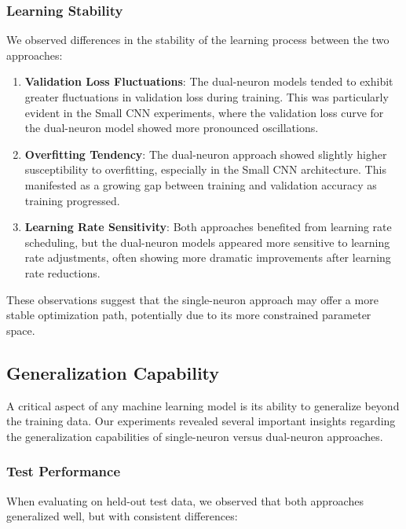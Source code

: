 \subsubsection{Learning Stability}

We observed differences in the stability of the learning process between the two approaches:

\begin{enumerate}
\item \textbf{Validation Loss Fluctuations}: The dual-neuron models tended to exhibit greater fluctuations in validation loss during training. This was particularly evident in the Small CNN experiments, where the validation loss curve for the dual-neuron model showed more pronounced oscillations.

\item \textbf{Overfitting Tendency}: The dual-neuron approach showed slightly higher susceptibility to overfitting, especially in the Small CNN architecture. This manifested as a growing gap between training and validation accuracy as training progressed.

\item \textbf{Learning Rate Sensitivity}: Both approaches benefited from learning rate scheduling, but the dual-neuron models appeared more sensitive to learning rate adjustments, often showing more dramatic improvements after learning rate reductions.
\end{enumerate}

These observations suggest that the single-neuron approach may offer a more stable optimization path, potentially due to its more constrained parameter space.

\subsection{Generalization Capability}

A critical aspect of any machine learning model is its ability to generalize beyond the training data. Our experiments revealed several important insights regarding the generalization capabilities of single-neuron versus dual-neuron approaches.

\subsubsection{Test Performance}

When evaluating on held-out test data, we observed that both approaches generalized well, but with consistent differences:


